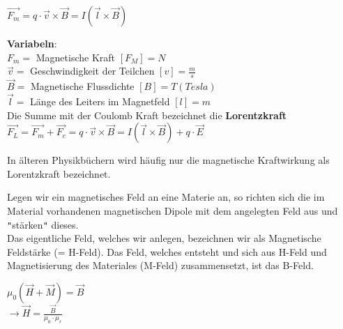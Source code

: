 \formulaBegin
$\vec{F_m} = q \cdot \vec{v} \times \vec{B} = I(\vec{l} \times \vec{B})$
\formulaEnd

\textbf{Variabeln}: \\
$ F_m = $ Magnetische Kraft $ [F_M] = N$ \\
$ \vec{v} = $ Geschwindigkeit der Teilchen $ [v] = \frac{m}{s}$ \\
$ \vec{B} = $ Magnetische Flussdichte $ [B] = T (Tesla)$ \\
$ \vec{l} = $ Länge des Leiters im Magnetfeld $ [l] = m $\\

Die Summe mit der Coulomb Kraft bezeichnet die \textbf{Lorentzkraft} \\

\formulaBegin
$\vec{F_L} = \vec{F_m} + \vec{F_c} = q \cdot \vec{v} \times \vec{B} = I(\vec{l} \times \vec{B}) + q \cdot \vec{E} $
\formulaEnd

In älteren Physikbüchern wird häufig nur die magnetische Kraftwirkung als Lorentzkraft bezeichnet.

\iend

\newpage
{}
\beginip
Legen wir ein magnetisches Feld an eine Materie an, so richten sich die im Material vorhandenen magnetischen Dipole mit dem angelegten Feld aus und \texttt{"}stärken\texttt{"} dieses. \\
Das eigentliche Feld, welches wir anlegen, bezeichnen wir als Magnetische Feldstärke (= H-Feld). Das Feld, welches entsteht und sich aus H-Feld und Magnetisierung des Materiales (M-Feld) zusammensetzt, ist das B-Feld.

\formulaBegin
$\displaystyle \mu_0 ( \vec{H} + \vec{M})  =  \vec{B} $\\
$\rightarrow \vec{H} = \frac{\vec{B}}{\mu_0\cdot \mu_r}
$
\formulaEnd

\begin{center}
\end{center}
\iend

